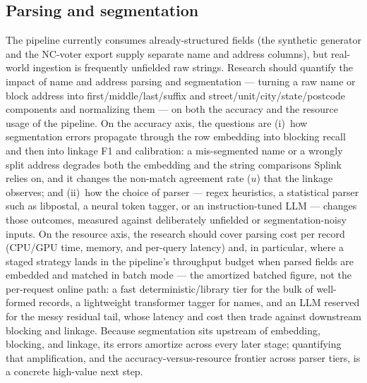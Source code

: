 \documentclass[11pt]{article}
\begin{document}
\subsection{Parsing and segmentation}
\label{sec:parsing}
The pipeline currently consumes already-structured fields (the synthetic generator and the NC-voter export supply separate name and address columns), but real-world ingestion is frequently unfielded raw strings. Research should quantify the impact of name and address parsing and segmentation --- turning a raw name or block address into first/middle/last/suffix and street/unit/city/state/postcode components and normalizing them --- on both the accuracy and the resource usage of the pipeline. On the accuracy axis, the questions are (i)~how segmentation errors propagate through the row embedding into blocking recall and then into linkage F1 and calibration: a mis-segmented name or a wrongly split address degrades both the embedding and the string comparisons Splink relies on, and it changes the non-match agreement rate ($u$) that the linkage observes; and (ii)~how the choice of parser --- regex heuristics, a statistical parser such as libpostal, a neural token tagger, or an instruction-tuned LLM --- changes those outcomes, measured against deliberately unfielded or segmentation-noisy inputs. On the resource axis, the research should cover parsing cost per record (CPU/GPU time, memory, and per-query latency) and, in particular, where a staged strategy lands in the pipeline's throughput budget when parsed fields are embedded and matched in batch mode --- the amortized batched figure, not the per-request online path: a fast deterministic/library tier for the bulk of well-formed records, a lightweight transformer tagger for names, and an LLM reserved for the messy residual tail, whose latency and cost then trade against downstream blocking and linkage. Because segmentation sits upstream of embedding, blocking, and linkage, its errors amortize across every later stage; quantifying that amplification, and the accuracy-versus-resource frontier across parser tiers, is a concrete high-value next step.
\end{document}
